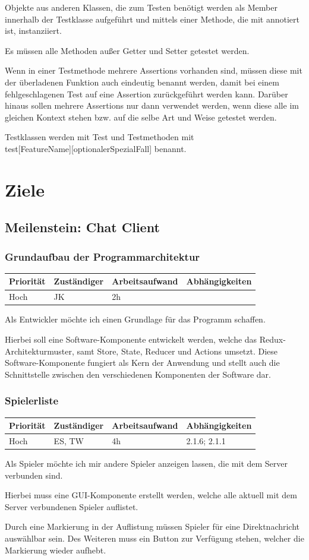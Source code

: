 \documentclass[a4paper]{scrreprt}
\newenvironment{requirement}[5] {
	\subsection{#1}
	\begin{tabularx}{\textwidth}{|X|l|X|X|}
		\hline
		Priorität & Zuständiger & Arbeitsaufwand & Abhängigkeiten \\
		\hline
		#2 & #3 & #4 & #5 \\
		\hline
	\end{tabularx}
	}{
	\newpage
	}
\begin{document}
Objekte aus anderen Klassen, die zum Testen benötigt werden als Member innerhalb der Testklasse aufgeführt und mittels einer Methode, die mit \glqq@BeforeEach\grqq{} annotiert ist, instanziiert.

Es müssen alle Methoden außer \glqq Getter\grqq{} und \glqq Setter\grqq{} getestet werden.

Wenn in einer Testmethode mehrere Assertions vorhanden sind, müssen diese mit der überladenen Funktion auch eindeutig benannt werden, damit bei einem fehlgeschlagenen Test auf eine Assertion zurückgeführt werden kann. Darüber hinaus sollen mehrere Assertions nur dann verwendet werden, wenn diese alle im gleichen Kontext stehen bzw. auf die selbe Art und Weise getestet werden.

Testklassen werden mit \glqq[KlassenName]Test\grqq{} und Testmethoden mit \\ \glqq test[FeatureName][optionalerSpezialFall]\grqq{} benannt.





\chapter{Ziele}
\section{Meilenstein: Chat Client}


\begin{requirement}{Grundaufbau der Programmarchitektur}{Hoch}{JK}{2h}{}

\begin{center}
	Als Entwickler möchte ich einen Grundlage für das Programm schaffen.
\end{center}

Hierbei soll eine Software-Komponente entwickelt werden, welche das Redux-Architekturmuster, samt \glqq Store\grqq{}, \glqq State\grqq{}, \glqq Reducer\grqq{} und \glqq Actions\grqq{} umsetzt. Diese Software-Komponente fungiert als Kern der Anwendung und stellt auch die Schnittstelle zwischen den verschiedenen Komponenten der Software dar.

\end{requirement}


\begin{requirement}{Spielerliste}{Hoch}{ES, TW}{4h}{2.1.6; 2.1.1}

\begin{center}
Als Spieler möchte ich mir andere Spieler anzeigen lassen, die mit dem Server verbunden sind.
\end{center}

Hierbei muss eine GUI-Komponente erstellt werden, welche alle aktuell mit dem Server verbundenen Spieler auflistet.

Durch eine Markierung in der Auflistung müssen Spieler für eine Direktnachricht auswählbar sein. Des Weiteren muss ein Button zur Verfügung stehen, welcher die Markierung wieder aufhebt.

\end{requirement}
\end{document}
